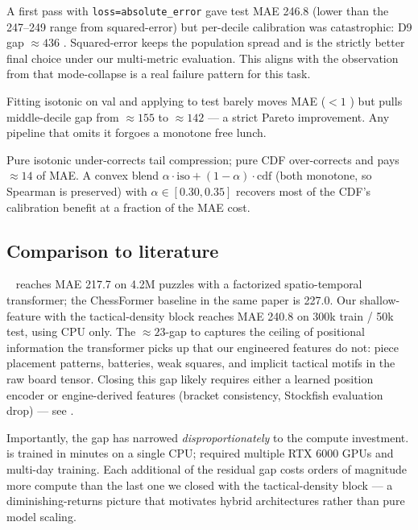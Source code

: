 A first pass with \texttt{loss=absolute\_error} gave test MAE 246.8 (lower than the 247--249 range from squared-error) but per-decile calibration was catastrophic: D9 gap $\approx 436$ \elo. Squared-error keeps the population spread and is the strictly better final choice under our multi-metric evaluation. This aligns with the observation from \glickformer that mode-collapse is a real failure pattern for this task.

Fitting isotonic on val and applying to test barely moves MAE ($< 1$ \elo) but pulls middle-decile gap from $\approx 155$ to $\approx 142$ --- a strict Pareto improvement. Any pipeline that omits it forgoes a monotone free lunch.

Pure isotonic under-corrects tail compression; pure CDF over-corrects and pays $\approx 14$ \elo of MAE. A convex blend $\alpha \cdot \text{iso} + (1-\alpha) \cdot \text{cdf}$ (both monotone, so Spearman is preserved) with $\alpha \in [0.30, 0.35]$ recovers most of the CDF's calibration benefit at a fraction of the MAE cost.

\subsection{Comparison to literature}
\glickformer~\citep{milosz2024glickformer} reaches MAE 217.7 on 4.2M puzzles with a factorized spatio-temporal transformer; the ChessFormer baseline in the same paper is 227.0. Our shallow-feature \hgbr with the tactical-density block reaches MAE 240.8 on 300k train / 50k test, using CPU only. The $\approx 23$-\elo gap to \glickformer captures the ceiling of positional information the transformer picks up that our engineered features do not: piece placement patterns, batteries, weak squares, and implicit tactical motifs in the raw board tensor. Closing this gap likely requires either a learned position encoder or engine-derived features (\maia bracket consistency, Stockfish evaluation drop) --- see .

Importantly, the gap has narrowed \emph{disproportionately} to the compute investment. \ours is trained in minutes on a single CPU; \glickformer required multiple RTX 6000 GPUs and multi-day training. Each additional \elo of the residual gap costs orders of magnitude more compute than the last one we closed with the tactical-density block --- a diminishing-returns picture that motivates hybrid architectures rather than pure model scaling.

